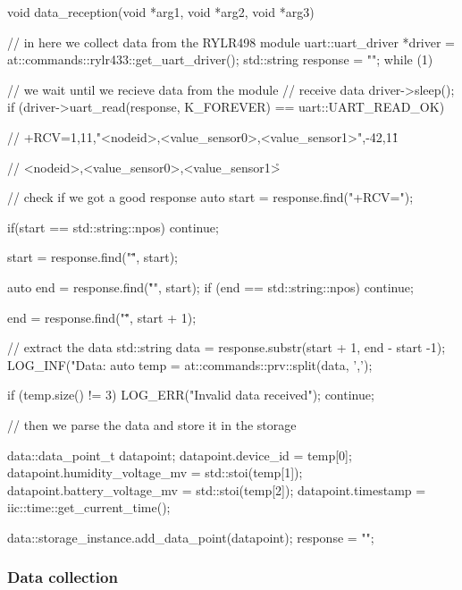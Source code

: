 \begin{cpp}[caption={Implementation of the data reception thread}]
void data_reception(void *arg1, void *arg2, void *arg3)
{
    // in here we collect data from the RYLR498 module
    uart::uart_driver *driver = at::commands::rylr433::get_uart_driver();
    std::string response = "";
    while (1)
    {
        // we wait until we recieve data from the module
        // receive data
        driver->sleep();
        if (driver->uart_read(response, K_FOREVER) == uart::UART_READ_OK)
        {   
            // +RCV=1,11,"<nodeid>,<value_sensor0>,<value_sensor1>",-42,11\r\n

            // <nodeid>,<value_sensor0>,<value_sensor1>\r\n

            // check if we got a good response
            auto start = response.find("+RCV=");

            if(start == std::string::npos)
            {
                continue;
            }

            start = response.find("\"", start);

            auto end = response.find("\r\n", start);
            if (end == std::string::npos)
            {
                continue;
            }

            end = response.find("\"", start + 1);

            // extract the data
            std::string data = response.substr(start + 1, end - start -1);
            LOG_INF("Data: %
            auto temp = at::commands::prv::split(data, ',');
            
            if (temp.size() != 3)
            {
                LOG_ERR("Invalid data received");
                continue;
            }
            
            // then we parse the data and store it in the storage

            data::data_point_t datapoint{};
            datapoint.device_id = temp[0];
            datapoint.humidity_voltage_mv = std::stoi(temp[1]);
            datapoint.battery_voltage_mv = std::stoi(temp[2]);
            datapoint.timestamp = iic::time::get_current_time();

            data::storage_instance.add_data_point(datapoint);
            response = "";
        }
    }
}
\end{cpp}

\subsubsection{Data collection}

